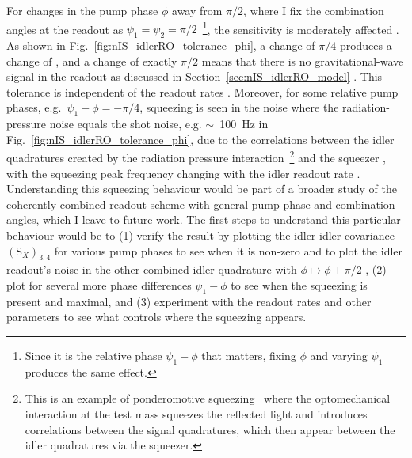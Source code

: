 For changes in the pump phase $\phi$ away from $\pi/2$, where I fix the combination angles at the readout as $\psi_1=\psi_2=\pi/2$~\footnote{Since it is the relative phase $\psi_1-\phi$ that matters, fixing $\phi$ and varying $\psi_1$ produces the same effect.}, the sensitivity is moderately affected . As shown in Fig.~\ref{fig:nIS_idlerRO_tolerance_phi}, a change of $\pi/4$ produces a change of , and a change of exactly $\pi/2$ means that there is no gravitational-wave signal in the readout as discussed in Section~\ref{sec:nIS_idlerRO_model} . This tolerance is independent of the readout rates  . Moreover, for some relative pump phases, e.g.\ $\psi_1-\phi=-\pi/4$, squeezing is seen in the noise where the radiation-pressure noise equals the shot noise, e.g. $\sim$~100~Hz in Fig.~\ref{fig:nIS_idlerRO_tolerance_phi}, due to the correlations between the idler quadratures created by the radiation pressure interaction~\footnote{This is an example of ponderomotive squeezing~\cite{} where the optomechanical interaction at the test mass squeezes the reflected light and introduces correlations between the signal quadratures, which then appear between the idler quadratures via the squeezer. }  and the squeezer , with the squeezing peak frequency changing with the idler readout rate . Understanding this squeezing behaviour would be part of a broader study of the coherently combined readout scheme with general pump phase and combination angles, which I leave to future work.
The first steps to understand this particular behaviour would be to (1) verify the result by plotting the idler-idler covariance $(\text{S}_X)_{3,4}$ for various pump phases to see when it is non-zero and to plot the idler readout's noise in the other combined idler quadrature with $\phi\mapsto\phi+\pi/2$ , (2) plot for several more phase differences $\psi_1-\phi$ to see when the squeezing is present and maximal, and (3) experiment with the readout rates and other parameters to see what controls where the squeezing appears.

